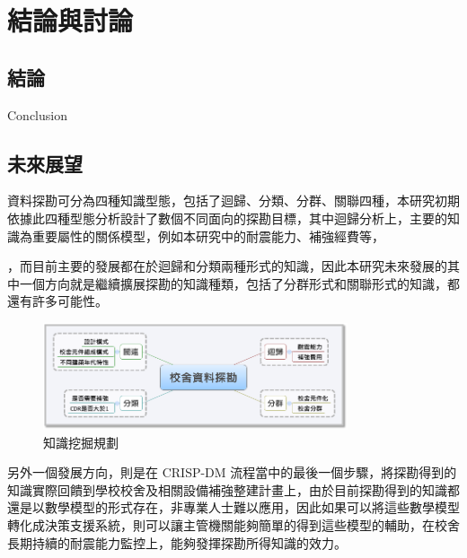 \renewcommand\thetable{\arabic{chapter}-\arabic{table}}
\chapter{結論與討論}
\label{cha:conclusions}


\section{結論}

Conclusion


\section{未來展望} 



資料探勘可分為四種知識型態，包括了迴歸、分類、分群、關聯四種，本研究初期依據此四種型態分析設計了數個不同面向的探勘目標，其中迴歸分析上，主要的知識為重要屬性的關係模型，例如本研究中的耐震能力、補強經費等，



，而目前主要的發展都在於迴歸和分類兩種形式的知識，因此本研究未來發展的其中一個方向就是繼續擴展探勘的知識種類，包括了分群形式和關聯形式的知識，都還有許多可能性。

\begin{figure}[hbtp]
  \begin{center}
    \includegraphics[width=0.8\textwidth]{figures/bigpicture.png}
    \caption{知識挖掘規劃} 
    \label{fig:bigpicture}
  \end{center}
\end{figure}

另外一個發展方向，則是在 CRISP-DM 流程當中的最後一個步驟，將探勘得到的知識實際回饋到學校校舍及相關設備補強整建計畫上，由於目前探勘得到的知識都還是以數學模型的形式存在，非專業人士難以應用，因此如果可以將這些數學模型轉化成決策支援系統，則可以讓主管機關能夠簡單的得到這些模型的輔助，在校舍長期持續的耐震能力監控上，能夠發揮探勘所得知識的效力。


